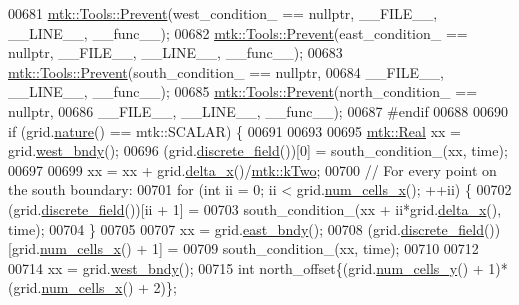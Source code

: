 \begin{DoxyCode}
00681   \hyperlink{classmtk_1_1Tools_a332324c6f25e66be9dff48c5987a3b9f}{mtk::Tools::Prevent}(west\_condition\_ == \textcolor{keyword}{nullptr}, \_\_FILE\_\_, \_\_LINE\_\_, \_\_func\_\_);
00682   \hyperlink{classmtk_1_1Tools_a332324c6f25e66be9dff48c5987a3b9f}{mtk::Tools::Prevent}(east\_condition\_ == \textcolor{keyword}{nullptr}, \_\_FILE\_\_, \_\_LINE\_\_, \_\_func\_\_);
00683   \hyperlink{classmtk_1_1Tools_a332324c6f25e66be9dff48c5987a3b9f}{mtk::Tools::Prevent}(south\_condition\_ == \textcolor{keyword}{nullptr},
00684                       \_\_FILE\_\_, \_\_LINE\_\_, \_\_func\_\_);
00685   \hyperlink{classmtk_1_1Tools_a332324c6f25e66be9dff48c5987a3b9f}{mtk::Tools::Prevent}(north\_condition\_ == \textcolor{keyword}{nullptr},
00686                       \_\_FILE\_\_, \_\_LINE\_\_, \_\_func\_\_);
00687 \textcolor{preprocessor}{  #endif}
00688 
00690   \textcolor{keywordflow}{if} (grid.\hyperlink{classmtk_1_1UniStgGrid2D_a99a3a9cdb05b7306be99bde935509e30}{nature}() == mtk::SCALAR) \{
00691 
00693 
00695     \hyperlink{group__c01-roots_gac080bbbf5cbb5502c9f00405f894857d}{mtk::Real} xx = grid.\hyperlink{classmtk_1_1UniStgGrid2D_af2b1712387ded85edaf2b64617d3fc13}{west\_bndy}();
00696     (grid.\hyperlink{classmtk_1_1UniStgGrid2D_a3e72d59843a3f9c5e47da07e5850dfe0}{discrete\_field}())[0] = south\_condition\_(xx, time);
00697 
00699     xx = xx + grid.\hyperlink{classmtk_1_1UniStgGrid2D_aca4710004c4a7da6a9e8fd6ab32a691f}{delta\_x}()/\hyperlink{group__c01-roots_gaf39c2d851a2db744f4feb1c5ab3ec2cf}{mtk::kTwo};
00700     \textcolor{comment}{// For every point on the south boundary:}
00701     \textcolor{keywordflow}{for} (\textcolor{keywordtype}{int} ii = 0; ii < grid.\hyperlink{classmtk_1_1UniStgGrid2D_a2d182866a398aba8e4829590e85bf939}{num\_cells\_x}(); ++ii) \{
00702       (grid.\hyperlink{classmtk_1_1UniStgGrid2D_a3e72d59843a3f9c5e47da07e5850dfe0}{discrete\_field}())[ii + 1] =
00703         south\_condition\_(xx + ii*grid.\hyperlink{classmtk_1_1UniStgGrid2D_aca4710004c4a7da6a9e8fd6ab32a691f}{delta\_x}(), time);
00704     \}
00705 
00707     xx = grid.\hyperlink{classmtk_1_1UniStgGrid2D_a03f689eb29a6369b82ce1207c655d5ff}{east\_bndy}();
00708     (grid.\hyperlink{classmtk_1_1UniStgGrid2D_a3e72d59843a3f9c5e47da07e5850dfe0}{discrete\_field}())[grid.\hyperlink{classmtk_1_1UniStgGrid2D_a2d182866a398aba8e4829590e85bf939}{num\_cells\_x}() + 1] =
00709       south\_condition\_(xx, time);
00710 
00712 
00714     xx = grid.\hyperlink{classmtk_1_1UniStgGrid2D_af2b1712387ded85edaf2b64617d3fc13}{west\_bndy}();
00715     \textcolor{keywordtype}{int} north\_offset\{(grid.\hyperlink{classmtk_1_1UniStgGrid2D_aed05a801cc9a76dba0ff203cea58a61a}{num\_cells\_y}() + 1)*(grid.\hyperlink{classmtk_1_1UniStgGrid2D_a2d182866a398aba8e4829590e85bf939}{num\_cells\_x}() + 2)\};

\end{DoxyCode}
